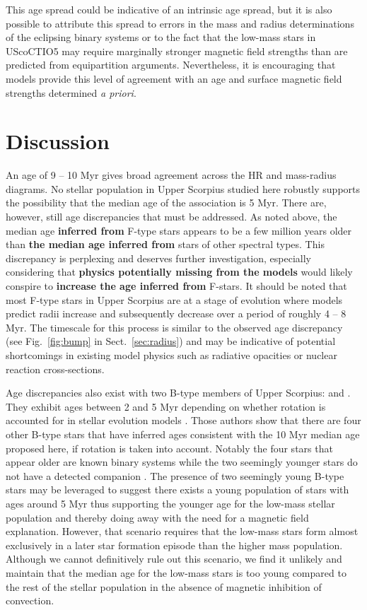 \documentclass{aa}
\begin{document}
This age spread could be indicative of an intrinsic age spread, but it is also possible to attribute this spread to errors in the mass and radius determinations of the eclipsing binary systems or to the fact that the low-mass stars in UScoCTIO5 may require marginally stronger magnetic field strengths than are predicted from equipartition arguments. Nevertheless, it is encouraging that models provide this level of agreement with an age and surface magnetic field strengths determined \emph{a priori}. 

\section{Discussion}
\label{sec:disc}
An age of 9 -- 10 Myr gives broad agreement across the HR and mass-radius diagrams. No stellar population in Upper Scorpius studied here robustly supports the possibility that the median age of the association is 5 Myr. There are, however, still age discrepancies that must be addressed. As noted above, the median age {\bf inferred from} F-type stars appears to be a few million years older than {\bf the median age inferred from} stars of other spectral types. This discrepancy is perplexing and deserves further investigation, especially considering that {\bf physics potentially missing from the models} would likely conspire to {\bf increase the age inferred from} F-stars. It should be noted that most F-type stars in Upper Scorpius are at a stage of evolution where models predict radii increase and subsequently decrease over a period of roughly 4 -- 8 Myr. The timescale for this process is similar to the observed age discrepancy (see Fig.~\ref{fig:bump} in Sect.~\ref{sec:radius}) and may be indicative of potential shortcomings in existing model physics such as radiative opacities or nuclear reaction cross-sections. 

Age discrepancies also exist with two B-type members of Upper Scorpius:  and . They exhibit ages between 2 and 5 Myr depending on whether rotation is accounted for in stellar evolution models \citep{Pecaut2012}. Those authors show that there are four other B-type stars that have inferred ages consistent with the 10 Myr median age proposed here, if rotation is taken into account. Notably the four stars that appear older are known binary systems while the two seemingly younger stars do not have a detected companion \citep{Pecaut2012}. The presence of two seemingly young B-type stars may be leveraged to suggest there exists a young population of stars with ages around 5 Myr thus supporting the younger age for the low-mass stellar population and thereby doing away with the need for a magnetic field explanation. However, that scenario requires that the low-mass stars form almost exclusively in a later star formation episode than the higher mass population. Although we cannot definitively rule out this scenario, we find it unlikely and maintain that the median age for the low-mass stars is too young compared to the rest of the stellar population in the absence of magnetic inhibition of convection.
\end{document}
